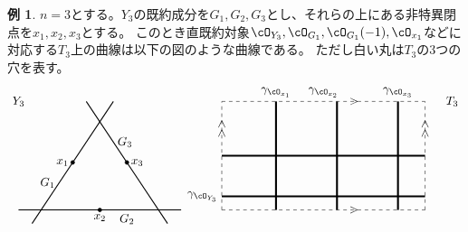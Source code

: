 \documentclass[uplatex,11pt,a4paper,dvipdfmx]{jsarticle}
\numberwithin{equation}{section}
\theoremstyle{definition}
\newtheorem{example}[theorem]{例}
\begin{document}
\begin{example}\label{correspondence_of_objects}
    $n=3$とする。$Y_3$の既約成分を$G_1, G_2, G_3$とし、それらの上にある非特異閉点を$x_1, x_2, x_3$とする。
    このとき直既約対象$\cO_{Y_3}, \cO_{G_1}, \cO_{G_1}(-1), \cO_{x_1}$などに対応する$T_3$上の曲線は以下の図のような曲線である。
    ただし白い丸は$T_3$の$3$つの穴を表す。
    \begin{displaymath}
        \begin{tikzpicture}[scale = 0.4]
            \draw(-10, 8) node{$Y_3$};
            \draw[thick] (-9,-1)--(-3,8);
            \draw[thick] (-10,0)--(2,0);
            \draw[thick] (1,-1)--(-5,8);

            \filldraw[black] (-6, 3.5) circle (4pt);
            \filldraw[black] (-4, 0) circle (4pt);
            \filldraw[black] (-2, 3.5) circle (4pt);

            \draw(-6, 3.5) node[left]{$x_1$};
            \draw(-4, 0) node[below]{$x_2$};
            \draw(-2, 3.5) node[right]{$x_3$};

            \draw(-7, 2) node[left]{$G_1$};
            \draw(-2, 0) node[below]{$G_2$};
            \draw(-3, 5) node[right]{$G_3$};

            \draw(22, 8) node{$T_3$};
            \draw[dashed] (5,0)--(20,0);
            \draw(14.75, 0) node{$>$};
            \draw[dashed] (5,0)--(5,8);
            \draw(5, 6) node{\rotatebox{90}{$>>$}};
            \draw[dashed] (5,8)--(20,8);
            \draw(14.75, 8) node{$>$};
            \draw[dashed] (20,0)--(20,8);
            \draw(20, 6) node{\rotatebox{90}{$>>$}};

            \draw[ultra thick] (5, 1)--(20, 1);
            \draw[ultra thick] (5, 4)--(20, 4);
            \draw(5, 1) node[left]{$\gamma_{\cO_{Y_3}}$};


            \draw[ultra thick] (8+1, 0)--(8+1, 8);
            \draw(8+1, 8) node[above]{$\gamma_{\cO_{x_1}}$};
            \draw[ultra thick] (12.5+1, 0)--(12.5+1, 8);
            \draw(12.5, 8) node[above]{$\gamma_{\cO_{x_2}}$};
            \draw[ultra thick] (17+1, 0)--(17+1, 8);
            \draw(17+1, 8) node[above]{$\gamma_{\cO_{x_3}}$};


\end{tikzpicture}
\end{displaymath}
\end{example}
\end{document}
